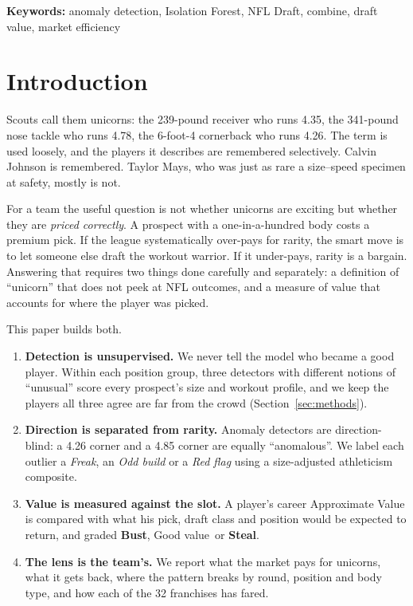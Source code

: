 \documentclass[11pt]{article}
\newcommand{\steal}{\textcolor{stealc}{\textbf{Steal}}}
\newcommand{\bust}{\textcolor{bustc}{\textbf{Bust}}}
\newcommand{\good}{\textcolor{goodc}{Good value}}
\begin{document}
\vspace{0.3em}
{\sffamily\small\color{goodc}\textbf{Keywords:} anomaly detection, Isolation Forest, NFL Draft, combine, draft value, market efficiency}

\section{Introduction}

Scouts call them unicorns: the 239-pound receiver who runs 4.35, the 341-pound nose tackle who runs 4.78, the 6-foot-4 cornerback who runs 4.26. The term is used loosely, and the players it describes are remembered selectively. Calvin Johnson is remembered. Taylor Mays, who was just as rare a size--speed specimen at safety, mostly is not.

For a team the useful question is not whether unicorns are exciting but whether they are \emph{priced correctly}. A prospect with a one-in-a-hundred body costs a premium pick. If the league systematically over-pays for rarity, the smart move is to let someone else draft the workout warrior. If it under-pays, rarity is a bargain. Answering that requires two things done carefully and separately: a definition of ``unicorn'' that does not peek at NFL outcomes, and a measure of value that accounts for where the player was picked.

This paper builds both.

\begin{enumerate}[leftmargin=1.4em]
\item \textbf{Detection is unsupervised.} We never tell the model who became a good player. Within each position group, three detectors with different notions of ``unusual'' score every prospect's size and workout profile, and we keep the players all three agree are far from the crowd (Section~\ref{sec:methods}).
\item \textbf{Direction is separated from rarity.} Anomaly detectors are direction-blind: a 4.26 corner and a 4.85 corner are equally ``anomalous''. We label each outlier a \emph{Freak}, an \emph{Odd build} or a \emph{Red flag} using a size-adjusted athleticism composite.
\item \textbf{Value is measured against the slot.} A player's career Approximate Value is compared with what his pick, draft class and position would be expected to return, and graded \bust, \good\ or \steal.
\item \textbf{The lens is the team's.} We report what the market pays for unicorns, what it gets back, where the pattern breaks by round, position and body type, and how each of the 32 franchises has fared.
\end{enumerate}
\end{document}
